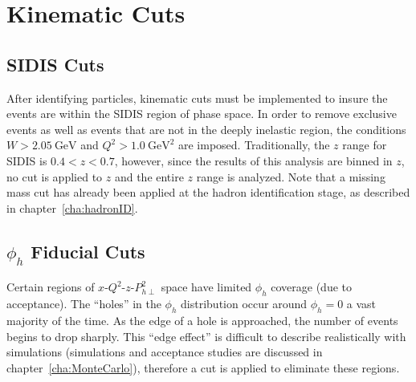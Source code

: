 \chapter{Kinematic Cuts}
\label{cha:KinematicCuts}

\section{SIDIS Cuts}
\label{sec:SIDISCuts}
After identifying particles, kinematic cuts must be implemented to insure the events are within the SIDIS region of phase space.
In order to remove exclusive events as well as events that are not in the deeply inelastic region, the conditions $W > 2.05\ \text{GeV}$ and $Q^2 > 1.0\ \text{GeV}^2$ are imposed.
Traditionally, the $z$ range for SIDIS is $0.4 < z < 0.7$, however, since the results of this analysis are binned in $z$, no cut is applied to $z$ and the entire $z$ range is analyzed.
Note that a missing mass cut has already been applied at the hadron identification stage, as described in chapter~\ref{cha:hadronID}.

\section{$\phi_h$ Fiducial Cuts}
\label{sec:phihFiducialCuts}
Certain regions of $x$-$Q^2$-$z$-$P_{h\perp}^2$ space have limited $\phi_h$ coverage (due to acceptance).
The ``holes'' in the $\phi_h$ distribution occur around $\phi_h = 0$ a vast majority of the time.
As the edge of a hole is approached, the number of events begins to drop sharply.
This ``edge effect'' is difficult to describe realistically with simulations (simulations and acceptance studies are discussed in chapter~\ref{cha:MonteCarlo}), therefore a cut is applied to eliminate these regions.

